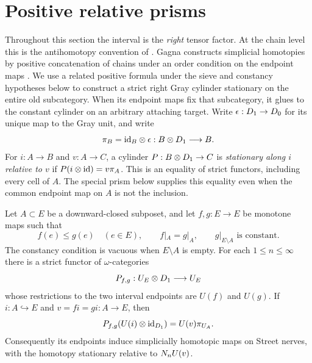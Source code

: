 \section{Positive relative prisms}\label{sec:prisms}

Throughout this section the interval is the \emph{right} tensor factor.
At the chain level this is the antihomotopy convention of
\cite[Appendix~B.4.1--B.4.2]{AraMaltsiniotis2020}.
Gagna constructs simplicial homotopies by positive concatenation of
chains under an order condition on the endpoint maps
\cite[Sections~6.3--6.8]{Gagna2018}. We use a related positive formula
under the sieve and constancy hypotheses below to construct a strict
right Gray cylinder stationary on the entire old subcategory. When its
endpoint maps fix that subcategory, it glues to the constant cylinder
on an arbitrary attaching target.
Write $\epsilon:D_{1}\to D_{0}$ for its unique map to the
Gray unit, and write
\[
 \pi_B=\mathrm{id}_B\otimes\epsilon:B\otimes D_{1}\longrightarrow B.
\]
For $i:A\to B$ and $v:A\to C$, a cylinder
$P:B\otimes D_{1}\to C$ is \emph{stationary along $i$ relative to $v$}
if $P(i\otimes\mathrm{id})=v\pi_A$.  This is an equality of strict functors,
including every cell of $A$.
The special prism below supplies this equality even when the common
endpoint map on $A$ is not the inclusion.

\begin{lemma}\label{lem:relative-prism}
Let $A\subset E$ be a downward-closed subposet, and let $f,g:E\to E$
be monotone maps such that
\[
 f(e)\le g(e)\quad(e\in E),\qquad f|_A=g|_A,
 \qquad g|_{E\setminus A}\text{ is constant}.
\]
The constancy condition is vacuous when $E\setminus A$ is empty.
For each $1\le n\le\infty$ there is a strict functor of
$\omega$-categories
\[
 P_{f,g}:U_{E}\otimes D_{1}\longrightarrow U_{E}
\]
whose restrictions to the two interval endpoints are $U(f)$ and
$U(g)$.  If $i:A\hookrightarrow E$ and $v=f i=g i:A\to E$, then
\begin{equation}\label{eq:prism-stationarity}
 P_{f,g}(U(i)\otimes\mathrm{id}_{D_{1}})=U(v)\pi_{U_{A}}.
\end{equation}
Consequently its endpoints induce simplicially homotopic maps on
Street nerves, with the homotopy stationary relative to $N_n U(v)$.
\end{lemma}

